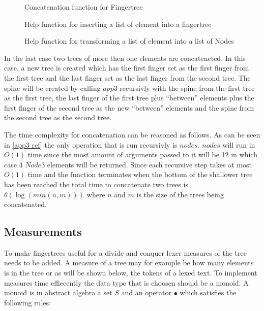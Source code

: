 \begin{figure}[h!]

\caption{Concatenation function for Fingertree \label{fig:concat}}
\end{figure}

\begin{figure}[h!]

\caption{Help function for inserting a list of element into a fingertree \label{fig:reduceAppend}}
\end{figure}

\begin{figure}[h!]

\caption{Help function for transforming a list of element into a list of Nodes \label{fig:nodesHelp}}
\end{figure}

In the last case two trees of more then one elements
are concateneted. In this case, a new tree is created which has the first
finger set as the first finger from the first tree and the last finger set as
the last finger from the second tree. The spine will be created by calling
$app3$ recursivly with the spine from the first tree as the first tree, the last
finger of the first tree plus ``between'' elements plus the first finger of the
second tree as the new ``between'' elements and the spine from the second tree
as the second tree.

The time complexity for concatenation can be reasoned as follows. As can be seen
in \cref{app3 ref} the only operation that is run recursivly is $nodes$. $nodes$
will run in $O(1)$ time since the most amount of arguments passed to it will be
12 in which case 4 $Node3$ elements will be returned. Since each recursive step
takes at most $O(1)$ time and the function terminates when the bottom of the
shallower tree has been reached the total time to concatenate two trees is
$\theta(\log(min(n,m)))$ where $n$ and $m$ is the size of the trees being
concatenated.

\subsection{Measurements \label{sub:measurement}}
To make fingertrees useful for a divide and conquer lexer measures of the tree
needs to be added. A measure of a tree may for example be how many elements is
in the tree or as will be shown below, the tokens of a lexed text. To implement
measures time effiecently the data type that is choosen should be a monoid. A
monoid is in abstract algebra a set $S$ and an operator $\bullet$ which
satisfies the following rules:

